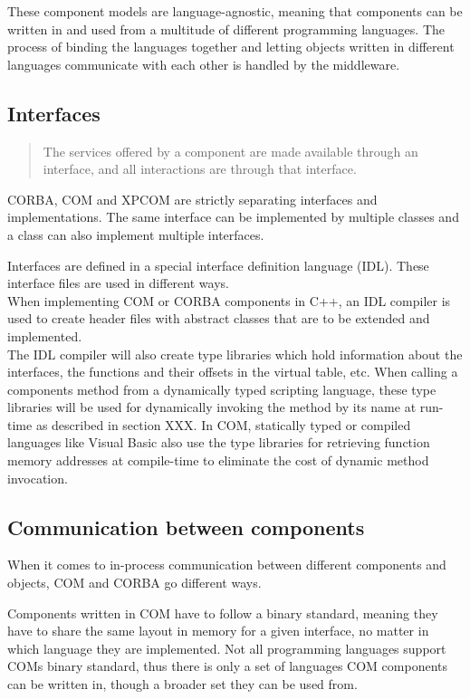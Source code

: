 These component models are language-agnostic, meaning that components can be written in and used from a multitude of different programming languages. The process of binding the languages together and letting objects written in different languages communicate with each other is handled by the middleware.

\subsection{Interfaces}

\begin{quotation}
The services offered by a component are made available through an interface, and all interactions are through that interface.
\end{quotation}

CORBA, COM and XPCOM are strictly separating interfaces and implementations. The same interface can be implemented by multiple classes and a class can also implement multiple interfaces.

Interfaces are defined in a special interface definition language (IDL). These interface files are used in different ways.\\
When implementing COM or CORBA components in C++, an IDL compiler is used to create header files with abstract classes that are to be extended and implemented.\\
The IDL compiler will also create type libraries which hold information about the interfaces, the functions and their offsets in the virtual table, etc. When calling a components method from a dynamically typed scripting language, these type libraries will be used for dynamically invoking the method by its name at run-time as described in section XXX.  In COM, statically typed or compiled languages like Visual Basic also use the type libraries for retrieving function memory addresses at compile-time to eliminate the cost of dynamic method invocation.

\subsection{Communication between components}

When it comes to in-process communication between different components and objects, COM and CORBA go different ways. 

Components written in COM have to follow a binary standard, meaning they have to share the same layout in memory for a given interface, no matter in which language they are implemented. Not all programming languages support COMs binary standard, thus there is only a set of languages COM components can be written in, though a broader set they can be used from.

